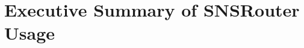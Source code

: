 \documentclass{sig-alternate}
\begin{document}
\section{Executive Summary of SNSRouter Usage}
\label{sec:Executive Summary of SNSRouter Usage}





%
%
%
%
%
%
%
%
\end{document}
